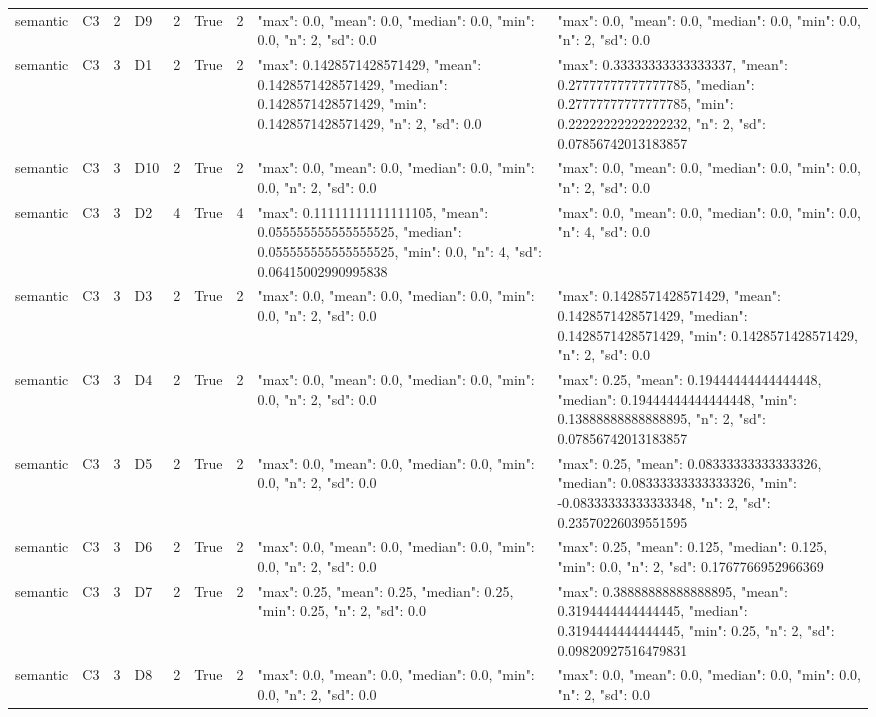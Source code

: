 \begin{tabular}{lllllllll}
semantic & C3 & 2 & D9 & 2 & True & 2 & {"max": 0.0, "mean": 0.0, "median": 0.0, "min": 0.0, "n": 2, "sd": 0.0} & {"max": 0.0, "mean": 0.0, "median": 0.0, "min": 0.0, "n": 2, "sd": 0.0} \\
semantic & C3 & 3 & D1 & 2 & True & 2 & {"max": 0.1428571428571429, "mean": 0.1428571428571429, "median": 0.1428571428571429, "min": 0.1428571428571429, "n": 2, "sd": 0.0} & {"max": 0.33333333333333337, "mean": 0.27777777777777785, "median": 0.27777777777777785, "min": 0.22222222222222232, "n": 2, "sd": 0.07856742013183857} \\
semantic & C3 & 3 & D10 & 2 & True & 2 & {"max": 0.0, "mean": 0.0, "median": 0.0, "min": 0.0, "n": 2, "sd": 0.0} & {"max": 0.0, "mean": 0.0, "median": 0.0, "min": 0.0, "n": 2, "sd": 0.0} \\
semantic & C3 & 3 & D2 & 4 & True & 4 & {"max": 0.11111111111111105, "mean": 0.055555555555555525, "median": 0.055555555555555525, "min": 0.0, "n": 4, "sd": 0.06415002990995838} & {"max": 0.0, "mean": 0.0, "median": 0.0, "min": 0.0, "n": 4, "sd": 0.0} \\
semantic & C3 & 3 & D3 & 2 & True & 2 & {"max": 0.0, "mean": 0.0, "median": 0.0, "min": 0.0, "n": 2, "sd": 0.0} & {"max": 0.1428571428571429, "mean": 0.1428571428571429, "median": 0.1428571428571429, "min": 0.1428571428571429, "n": 2, "sd": 0.0} \\
semantic & C3 & 3 & D4 & 2 & True & 2 & {"max": 0.0, "mean": 0.0, "median": 0.0, "min": 0.0, "n": 2, "sd": 0.0} & {"max": 0.25, "mean": 0.19444444444444448, "median": 0.19444444444444448, "min": 0.13888888888888895, "n": 2, "sd": 0.07856742013183857} \\
semantic & C3 & 3 & D5 & 2 & True & 2 & {"max": 0.0, "mean": 0.0, "median": 0.0, "min": 0.0, "n": 2, "sd": 0.0} & {"max": 0.25, "mean": 0.08333333333333326, "median": 0.08333333333333326, "min": -0.08333333333333348, "n": 2, "sd": 0.23570226039551595} \\
semantic & C3 & 3 & D6 & 2 & True & 2 & {"max": 0.0, "mean": 0.0, "median": 0.0, "min": 0.0, "n": 2, "sd": 0.0} & {"max": 0.25, "mean": 0.125, "median": 0.125, "min": 0.0, "n": 2, "sd": 0.1767766952966369} \\
semantic & C3 & 3 & D7 & 2 & True & 2 & {"max": 0.25, "mean": 0.25, "median": 0.25, "min": 0.25, "n": 2, "sd": 0.0} & {"max": 0.38888888888888895, "mean": 0.3194444444444445, "median": 0.3194444444444445, "min": 0.25, "n": 2, "sd": 0.09820927516479831} \\
semantic & C3 & 3 & D8 & 2 & True & 2 & {"max": 0.0, "mean": 0.0, "median": 0.0, "min": 0.0, "n": 2, "sd": 0.0} & {"max": 0.0, "mean": 0.0, "median": 0.0, "min": 0.0, "n": 2, "sd": 0.0} \\

\end{tabular}

